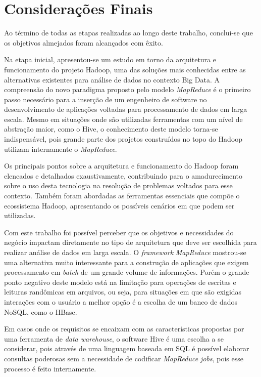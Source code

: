 \chapter{Considerações Finais}
\label{cap:conclusao}

Ao término de todas as etapas realizadas ao longo deste trabalho, conclui-se que os objetivos almejados foram alcançados com êxito.

Na etapa inicial, apresentou-se um estudo em torno da arquitetura e funcionamento do projeto Hadoop, uma das soluções mais conhecidas entre as alternativas existentes para análise de dados no contexto Big Data. A compreensão do novo paradigma proposto pelo modelo \textit{MapReduce} é o primeiro passo necessário para a inserção de um engenheiro de software no desenvolvimento de aplicações voltadas para processamento de dados em larga escala. Mesmo em situações onde são utilizadas ferramentas com um nível de abstração maior, como o Hive, o conhecimento deste modelo torna-se indispensável, pois grande parte dos projetos construídos no topo do Hadoop utilizam internamente o \textit{MapReduce}.

Os principais pontos sobre a arquitetura e funcionamento do Hadoop foram elencados e detalhados exaustivamente, contribuindo para o amadurecimento sobre o uso desta tecnologia na resolução de problemas voltados para esse contexto. Também foram abordadas as ferramentas essenciais que compõe o ecossistema Hadoop, apresentando os possíveis cenários em que podem ser utilizadas.

Com este trabalho foi possível perceber que os objetivos e necessidades do negócio impactam diretamente no tipo de arquitetura que deve ser escolhida para realizar análise de dados em larga escala. O \textit{framework} \textit{MapReduce} mostrou-se uma alternativa muito interessante para a construção de aplicações que exigem processamento em \textit{batch} de um grande volume de informações. Porém o grande ponto negativo deste modelo está na limitação para operações de escritas e leituras randômicas em arquivos, ou seja, para situações em que são exigidas interações com o usuário a melhor opção é a escolha de um banco de dados NoSQL, como o HBase.

Em casos onde os requisitos se encaixam com as características propostas por uma ferramenta de \textit{data warehouse}, o software Hive é uma escolha a se considerar, pois através de uma linguagem baseada em SQL é possível elaborar consultas poderosas sem a necessidade de codificar \textit{MapReduce jobs}, pois esse processo é feito internamente.

